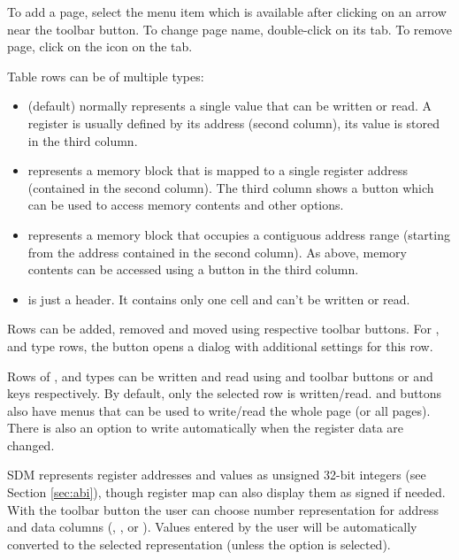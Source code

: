 \documentclass[a4paper,12pt,twoside,extrafontsizes]{memoir}
\begin{document}
To add a page, select the  menu item which is available after clicking on an arrow near the  toolbar button. To change page name, double-click on its tab. To remove page, click on the  icon on the tab.

Table rows can be of multiple types:

\begin{itemize}
	\item {} (default) normally represents a single value that can be written or read. A register is usually defined by its address (second column), its value is stored in the third column.
	\item {} represents a memory block that is mapped to a single register address (contained in the second column). The third column shows a button which can be used to access memory contents and other options.
	\item {} represents a memory block that occupies a contiguous address range (starting from the address contained in the second column). As above, memory contents can be accessed using a button in the third column.
	\item {} is just a header. It contains only one cell and can't be written or read.
\end{itemize}

Rows can be added, removed and moved using respective toolbar buttons. For ,  and  type rows, the  button opens a dialog with additional settings for this row.

Rows of ,  and  types can be written and read using  and  toolbar buttons or  and  keys respectively. By default, only the selected row is written/read.  and  buttons also have menus that can be used to write/read the whole page (or all pages). There is also an option to write automatically when the register data are changed.

SDM represents register addresses and values as unsigned 32-bit integers (see Section \ref{sec:abi}), though register map can also display them as signed if needed. With the  toolbar button the user can choose number representation for address and data columns (, ,  or ). Values entered by the user will be automatically converted to the selected representation (unless the  option is selected).
\end{document}
